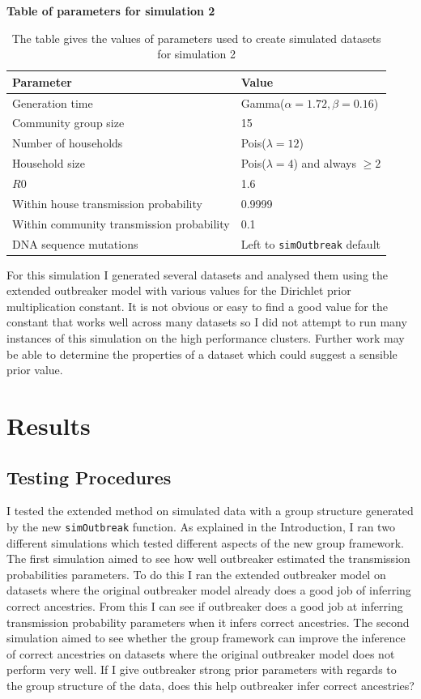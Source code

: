 \documentclass[11pt,a4paper]{report}
\begin{document}
\begin{table}[h!]
\centering
{\bf Table of parameters for simulation 2}
\caption{The table gives the values of parameters used to create simulated datasets for simulation 2}
\begin{tabular}{|l|l|}
\hline
Parameter & Value \\
\hline
Generation time & Gamma($\alpha = 1.72	,\beta=0.16$) \\
\hline
Community group size & 15 \\
\hline
Number of households & Pois($\lambda=12$) \\
\hline
Household size & Pois($\lambda=4$) and always $\geq 2$ \\
\hline
$R0$ & 1.6 \\
\hline
Within house transmission probability & 0.9999 \\
\hline
Within community transmission probability & 0.1 \\
\hline
DNA sequence mutations & Left to {\tt simOutbreak} default \\
\hline
\end{tabular}
\end{table}

For this simulation I generated several datasets and analysed them using the extended outbreaker model with various values for the Dirichlet prior multiplication constant. It is not obvious or easy to find a good value for the constant that works well across many datasets so I did not attempt to run many instances of this simulation on the high performance clusters. Further work may be able to determine the properties of a dataset which could suggest a sensible prior value.



\chapter{Results}
\section{Testing Procedures}

I tested the extended method on simulated data with a group structure generated by the new {\tt simOutbreak} function. As explained in the Introduction, I ran two different simulations which tested different aspects of the new group framework. The first simulation aimed to see how well outbreaker estimated the transmission probabilities parameters. To do this I ran the extended outbreaker model on datasets where the original outbreaker model already does a good job of inferring correct ancestries. From this I can see if outbreaker does a good job at inferring transmission probability parameters when it infers correct ancestries. The second simulation aimed to see whether the group framework can improve the inference of correct ancestries on datasets where the original outbreaker model does not perform very well. If I give outbreaker strong prior parameters with regards to the group structure of the data, does this help outbreaker infer correct ancestries?
\end{document}
